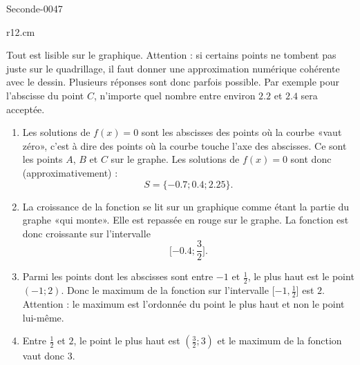 
\begin{corrige}{Seconde-0047}


\begin{wrapfigure}[7]{r}{12.cm}
   \vspace{-1.5cm}        %
   \centering
   
\end{wrapfigure}

    Tout est lisible sur le graphique. Attention : si certains points ne tombent pas juste sur le quadrillage, il faut donner une approximation numérique cohérente avec le dessin. Plusieurs réponses sont donc parfois possible. Par exemple pour l'abscisse du point \( C\), n'importe quel nombre entre environ \( 2.2\) et \( 2.4\) sera acceptée.
    \begin{enumerate}
        \item
            Les solutions de \( f(x)=0\) sont les abscisses des points où la courbe «vaut zéro», c'est à dire des points où la courbe touche l'axe des abscisses. Ce sont les points \( A\), \( B\) et \( C\) sur le graphe. Les solutions de \( f(x)=0\) sont donc (approximativement) :
            \begin{equation}
                S=\{ -0.7;0.4;2.25 \}.
            \end{equation}
        \item
            La croissance de la fonction se lit sur un graphique comme étant la partie du graphe «qui monte». Elle est repassée en rouge sur le graphe. La fonction est donc croissante sur l'intervalle
            \begin{equation}
                \mathopen[ -0.4 ; \frac{ 3 }{2} \mathclose].
            \end{equation}
        \item
            Parmi les points dont les abscisses sont entre \( -1\) et \( \frac{ 1 }{2}\), le plus haut est le point \( (-1;2)\). Donc le maximum de la fonction sur l'intervalle \( \mathopen[ -1 , \frac{ 1 }{2} \mathclose]\) est \( 2\). Attention : le maximum est l'ordonnée du point le plus haut et non le point lui-même.
        \item
            Entre \( \frac{ 1 }{2}\) et \( 2\), le point le plus haut est \( (\frac{ 3 }{2};3)\) et le maximum de la fonction vaut donc \( 3\).

\end{enumerate}
\end{corrige}
